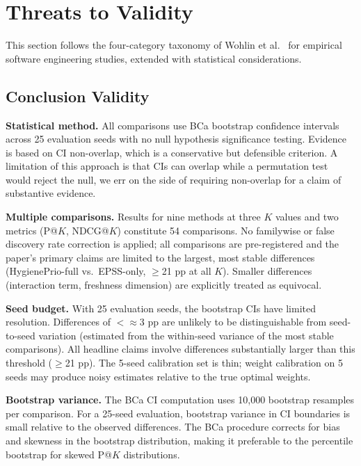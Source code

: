 \section{Threats to Validity}
\label{sec:threats}

This section follows the four-category taxonomy of Wohlin et al.~\cite{wohlin2012experimentation} for empirical software engineering studies, extended with statistical considerations.

\subsection{Conclusion Validity}

\textbf{Statistical method.} All comparisons use BCa bootstrap confidence intervals~\cite{efron1994introduction} across 25 evaluation seeds with no null hypothesis significance testing. Evidence is based on CI non-overlap, which is a conservative but defensible criterion. A limitation of this approach is that CIs can overlap while a permutation test would reject the null, we err on the side of requiring non-overlap for a claim of substantive evidence.

\textbf{Multiple comparisons.} Results for nine methods at three $K$ values and two metrics (P@$K$, NDCG@$K$) constitute 54 comparisons. No familywise or false discovery rate correction is applied; all comparisons are pre-registered and the paper's primary claims are limited to the largest, most stable differences (HygienePrio-full vs.\ EPSS-only, $\geq$21 pp at all $K$). Smaller differences (interaction term, freshness dimension) are explicitly treated as equivocal.

\textbf{Seed budget.} With 25 evaluation seeds, the bootstrap CIs have limited resolution. Differences of $< \approx$3 pp are unlikely to be distinguishable from seed-to-seed variation (estimated from the within-seed variance of the most stable comparisons). All headline claims involve differences substantially larger than this threshold ($\geq$21 pp). The 5-seed calibration set is thin; weight calibration on 5 seeds may produce noisy estimates relative to the true optimal weights.

\textbf{Bootstrap variance.} The BCa CI computation uses 10,000 bootstrap resamples per comparison. For a 25-seed evaluation, bootstrap variance in CI boundaries is small relative to the observed differences. The BCa procedure corrects for bias and skewness in the bootstrap distribution, making it preferable to the percentile bootstrap for skewed P@$K$ distributions.


